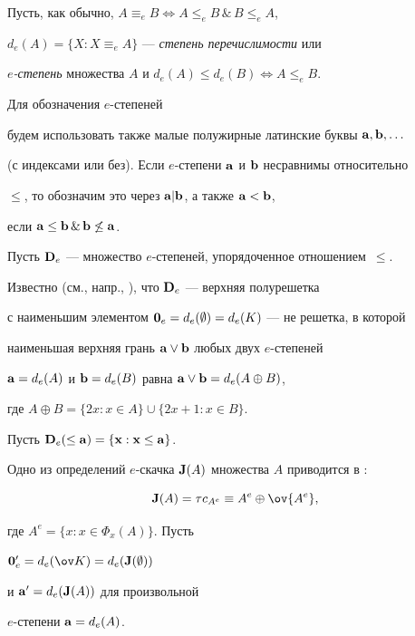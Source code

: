 Пусть, как обычно, $A\equiv_eB\iff A\leq_eB\,\&\,B\leq_eA$,


$d_e(A)=\{X:X\equiv_eA\}$ --- {\it степень перечислимости} или


{\it $e$-степень} множества $A$ и $d_e(A)\leq d_e(B)\iff A\leq_eB$. 


Для обозначения $e$-степеней


будем использовать также малые полужирные латинские буквы $\bold{a,b},\dotsc$


(с индексами или без). Если $e$-степени $\bold a$ и $\bold b$ несравнимы относительно


$\leq$, то обозначим это через ${\bold a}|{\bold b}$, а также ${\bold a}<{\bold b}$,


если ${\bold a}\leq{\bold b}\,\&\,{\bold b}\not\leq{\bold a}$.





Пусть ${\bold D}_e$ --- множество $e$-степеней, упорядоченное отношением~$\leq$.


Известно (см., напр., \cite{r3}), что ${\bold D}_e$ --- верхняя полурешетка


с наименьшим элементом ${\bold 0}_e=d_e(\emptyset)=d_e(K)$ --- не решетка, в которой


наименьшая верхняя грань ${\bold a}\lor{\bold b}$ любых двух $e$-степеней


${\bold a}=d_e(A)$ и ${\bold b}=d_e(B)$ равна ${\bold a}\lor{\bold b}=d_e(A\oplus B)$,


где $A\oplus B=\{2x:x\in A\}\cup\{2x+1:x\in B\}$.


Пусть $\bold D_e(\le \bold a)=\{\bold x:\bold x\le\bold a\}$.





Одно из определений $e$-скачка ${\bold J}(A)$ множества $A$ приводится в \cite{r4}:


$$


{\bold J}(A)=\tau c_{A^e}\equiv A^e\oplus\ov{A^e},


$$


где $A^e=\{x:x\in\Phi_x(A)\}$. Пусть


${\bold 0}'_e=d_e(\ov K)=d_e({\bold J}(\emptyset))$


и ${\bold a}'=d_e({\bold J}(A))$ для произвольной


$e$-степени ${\bold a}=d_e(A)$.








